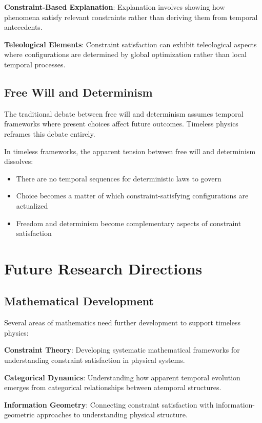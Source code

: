 \documentclass[12pt]{article}
\begin{document}
\textbf{Constraint-Based Explanation}: Explanation involves showing how phenomena satisfy relevant constraints rather than deriving them from temporal antecedents.

\textbf{Teleological Elements}: Constraint satisfaction can exhibit teleological aspects where configurations are determined by global optimization rather than local temporal processes.

\subsection{Free Will and Determinism}

The traditional debate between free will and determinism assumes temporal frameworks where present choices affect future outcomes. Timeless physics reframes this debate entirely.

In timeless frameworks, the apparent tension between free will and determinism dissolves:
\begin{itemize}
\item There are no temporal sequences for deterministic laws to govern
\item Choice becomes a matter of which constraint-satisfying configurations are actualized
\item Freedom and determinism become complementary aspects of constraint satisfaction
\end{itemize}

\section{Future Research Directions}

\subsection{Mathematical Development}

Several areas of mathematics need further development to support timeless physics:

\textbf{Constraint Theory}: Developing systematic mathematical frameworks for understanding constraint satisfaction in physical systems.

\textbf{Categorical Dynamics}: Understanding how apparent temporal evolution emerges from categorical relationships between atemporal structures.

\textbf{Information Geometry}: Connecting constraint satisfaction with information-geometric approaches to understanding physical structure.
\end{document}
